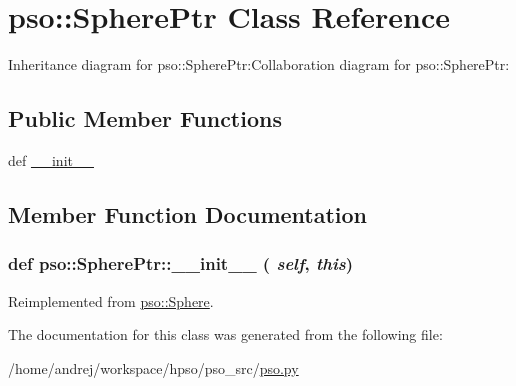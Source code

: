 \hypertarget{classpso_1_1SpherePtr}{
\section{pso::SpherePtr Class Reference}
\label{classpso_1_1SpherePtr}
}
Inheritance diagram for pso::SpherePtr:Collaboration diagram for pso::SpherePtr:\subsection*{Public Member Functions}
\begin{CompactItemize}
\item 
def \hyperlink{classpso_1_1SpherePtr_5ce4f7ba2467b0c1a36992cbe1bd7e4d}{\_\-\_\-init\_\-\_\-}
\end{CompactItemize}


\subsection{Member Function Documentation}
\hypertarget{classpso_1_1SpherePtr_5ce4f7ba2467b0c1a36992cbe1bd7e4d}{
\subsubsection{\setlength{\rightskip}{0pt plus 5cm}def pso::SpherePtr::\_\-\_\-init\_\-\_\- ( {\em self}, \/   {\em this})}}
\label{classpso_1_1SpherePtr_5ce4f7ba2467b0c1a36992cbe1bd7e4d}




Reimplemented from \hyperlink{classpso_1_1Sphere_e4b014b1b87400b7a6a35b5f2311620a}{pso::Sphere}.

The documentation for this class was generated from the following file:\begin{CompactItemize}
\item 
/home/andrej/workspace/hpso/pso\_\-src/\hyperlink{pso_8py}{pso.py}\end{CompactItemize}
